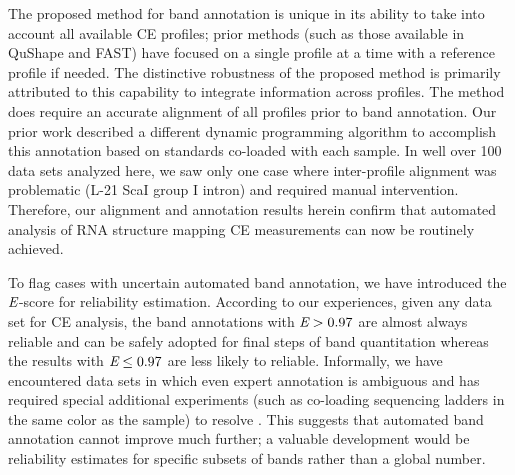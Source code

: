

The proposed method for band annotation is unique in its ability to take into account all available CE profiles; prior methods (such as those available in QuShape and FAST) have focused on a single profile at a time with a reference profile if needed. The distinctive robustness of the proposed method is primarily attributed to this capability to integrate information across profiles. The method does require an accurate alignment of all profiles prior to band annotation. Our prior work \citep{Yoon2011} described a different dynamic programming algorithm to accomplish this annotation based on standards co-loaded with each sample. In well over 100 data sets analyzed here, we saw only one case where inter-profile alignment was problematic (L-21 ScaI group I intron) and required manual intervention. Therefore, our alignment and annotation results herein confirm that automated analysis of RNA structure mapping CE measurements can now be routinely achieved.

To flag cases with uncertain automated band annotation, we have introduced the ${\emph{E}}$-score for reliability estimation. According to our experiences, given any data set for CE analysis, the band annotations with ${\emph{E}} > 0.97$ are almost always reliable and can be safely adopted for final steps of band quantitation whereas the results with ${\emph{E}} \le 0.97$ are less likely to reliable. Informally, we have encountered data sets in which even expert annotation is ambiguous and has required special additional experiments (such as co-loading sequencing ladders in the same color as the sample) to resolve \citep{tian2014nature}. This suggests that automated band annotation cannot improve much further; a valuable development would be reliability estimates for specific subsets of bands rather than a global number.


